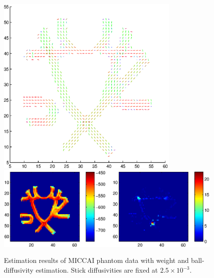 \documentclass{article}
\begin{document}
\begin{figure}[H]
  \caption{Estimation results of MICCAI phantom data with weight and ball-diffusivity estimation. Stick diffusivities are fixed at $2.5\times 10^{-3}$.}
  \centering
  \includegraphics[width=0.8\textwidth]{figures/phantom_modbas_weights_dir.eps}
  \includegraphics[width=\textwidth]{figures/phantom_modbas_weights_like.eps}
\end{figure}
\end{document}
